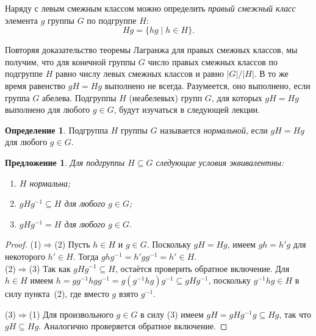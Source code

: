 \documentclass[a4paper,10pt]{amsart}
\newtheorem{proposition}{Предложение}
\theoremstyle{definition}
\newtheorem{definition}{Определение}
\theoremstyle{remark}
\begin{document}
Наряду с левым смежным классом можно определить {\it правый смежный
класс} элемента $g$ группы $G$ по подгруппе $H$:
$$
Hg=\{hg \mid h\in H\}.
$$

Повторяя доказательство теоремы Лагранжа для правых смежных классов,
мы получим, что для конечной группы $G$ число правых смежных классов
по подгруппе $H$ равно числу левых смежных классов и равно
$|G|/|H|$. В то же время равенство $gH=Hg$ выполнено не всегда.
Разумеется, оно выполнено, если группа $G$ абелева. Подгруппы $H$
(неабелевых) групп $G$, для которых $gH=Hg$ выполнено для любого
$g\in G$, будут изучаться в следующей лекции.

\begin{definition}
Подгруппа $H$ группы $G$ называется {\it нормальной}, если $gH=Hg$
для любого $g\in G$.
\end{definition}

\begin{proposition}
Для подгруппы $H \subseteq G$ следующие условия эквивалентны:

\vspace{-2mm}
\begin{enumerate}
\item[(1)]
$H$ нормальна;

\item[(2)]
$gHg^{-1} \subseteq H$ для любого $g \in G$;

\item[(3)]
$gHg^{-1}=H$ для любого $g\in G$.
\end{enumerate}
\end{proposition}

\vspace{-6mm}

\begin{proof}
(1)$\Rightarrow$(2) Пусть $h \in H$ и $g \in G$. Поскольку $gH =
Hg$, имеем $gh = h'g$ для некоторого $h' \in H$. Тогда $ghg^{-1} =
h'gg^{-1} = h' \in H$.\\
(2)$\Rightarrow$(3) Так как $gHg^{-1} \subseteq H$, остаётся
проверить обратное включение. Для $h \in H$ имеем $h = gg^{-1} h g
g^{-1} = g(g^{-1}hg)g^{-1} \subseteq gHg^{-1}$, поскольку $g^{-1}hg
\in H$ в силу пункта~(2), где вместо $g$ взято $g^{-1}$.

(3)$\Rightarrow$(1) Для произвольного $g \in G$ в силу (3) имеем $gH
= gHg^{-1} g \subseteq Hg$, так что $gH \subseteq Hg$. Аналогично
проверяется обратное включение.
\end{proof}
\vspace{-1mm}
\end{document}

